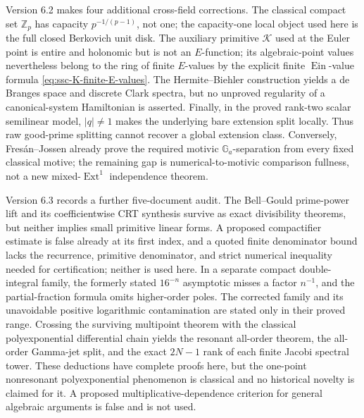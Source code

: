 \documentclass[11pt]{article}
\theoremstyle{definition}
\theoremstyle{remark}
\newcommand{\Ein}{\operatorname{Ein}}
\begin{document}
Version 6.2 makes four additional cross-field corrections.  The classical
compact set \(\mathbb Z_p\) has capacity \(p^{-1/(p-1)}\), not one; the
capacity-one local object used here is the full closed Berkovich unit disk.
The auxiliary primitive \(\mathcal K\) used at the Euler point is entire and
holonomic but is not an \(E\)-function; its algebraic-point values nevertheless
belong to the ring of finite \(E\)-values by the explicit finite
\(\Ein\)-value formula \eqref{eq:ssc-K-finite-E-values}.
The Hermite--Biehler construction yields a de Branges space and discrete
Clark spectra, but no unproved regularity of a canonical-system Hamiltonian
is asserted.  Finally, in the proved rank-two scalar semilinear model,
\(|q|\ne1\) makes the underlying bare extension split locally.  Thus raw
good-prime splitting cannot
recover a global extension class.  Conversely, Fres\'an--Jossen already prove
the required motivic \(\mathbb G_a\)-separation from every fixed classical
motive; the remaining gap is numerical-to-motivic comparison fullness, not a
new mixed-\(\operatorname{Ext}^1\) independence theorem.

Version 6.3 records a further five-document audit.  The Bell--Gould
prime-power lift and its coefficientwise CRT synthesis survive as exact
divisibility theorems, but neither implies small primitive linear forms.
A proposed compactifier estimate is false already at its first index, and a
quoted finite denominator bound lacks the recurrence, primitive denominator,
and strict numerical inequality needed for certification; neither is used
here.  In a separate compact double-integral family, the formerly stated
\(16^{-n}\) asymptotic misses a factor \(n^{-1}\), and the partial-fraction
formula omits higher-order poles.  The corrected family and its unavoidable
positive logarithmic contamination are stated only in their proved range.
Crossing the surviving multipoint theorem with the classical
polyexponential differential chain yields the resonant all-order theorem,
the all-order Gamma-jet split, and the exact \(2N-1\) rank of each finite
Jacobi spectral tower.  These deductions have complete proofs here, but the
one-point nonresonant polyexponential phenomenon is classical and no
historical novelty is claimed for it.  A proposed multiplicative-dependence
criterion for general algebraic arguments is false and is not used.
\end{document}
